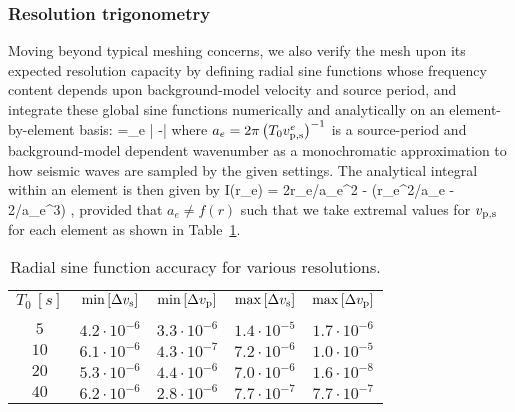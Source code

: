\subsubsection{Resolution trigonometry}
%
Moving beyond typical meshing concerns, we also verify the mesh upon its
expected resolution capacity by defining radial sine functions whose frequency
content depends upon background-model velocity and source period, and integrate
these global sine functions numerically and analytically on an element-by-element
basis:
%
\eq
{} =\sum_e \left| -\right|
\en
%
where $a_e=2\pi \left(T_0 {v_{\rm p,s}^e}\right)^{-1}$ is a source-period and background-model
dependent wavenumber as a monochromatic approximation to how seismic waves are
sampled by the given settings. The analytical integral within an element is then given by
%
\eq
{\mathcal I}(r_e) = 2r_e/a_e^2  - (r_e^2/a_e - 2/a_e^3) ,
\en
%
provided that $a_e\neq f(r)$ such that we take extremal values for $v_{\rm p,s}$ for
each element as shown in Table~\ref{table:resol_sine}.
%
\begin{table}[htb!]
\label{table:resol_sine}
\begin{center}
\caption{Radial sine function accuracy for various resolutions.}
\begin{tabular}{@{}ccccc}
&&&\\
\hline\hline
$T_0\, [s]$ & $\min{\left[\Delta v_{\rm s} \right]}$ &  $\min{\left[\Delta v_{\rm p} \right]}$
& $\max{\left[\Delta v_{\rm s} \right]}$ &  $\max{\left[\Delta v_{\rm p} \right]}$  \\
\hline\\
$5$ &  $4.2\cdot 10^{-6}$ & $3.3\cdot 10^{-6}$  & $1.4\cdot 10^{-5}$ & $1.7\cdot 10^{-6}$ \\[10pt]
$10$ & $6.1\cdot 10^{-6}$ & $4.3\cdot 10^{-7}$ & $7.2\cdot 10^{-6}$ & $1.0\cdot 10^{-5}$   \\[10pt]
$20$ & $5.3\cdot 10^{-6}$ & $4.4\cdot 10^{-6}$ & $7.0\cdot 10^{-6}$ & $1.6\cdot 10^{-8}$    \\[10pt]
$40$ & $6.2\cdot 10^{-6}$ & $2.8\cdot 10^{-6}$ & $7.7\cdot 10^{-7}$ & $7.7\cdot 10^{-7}$    \\[10pt]
%
\hline
\end{tabular}
\end{center}
\end{table}
%
%
